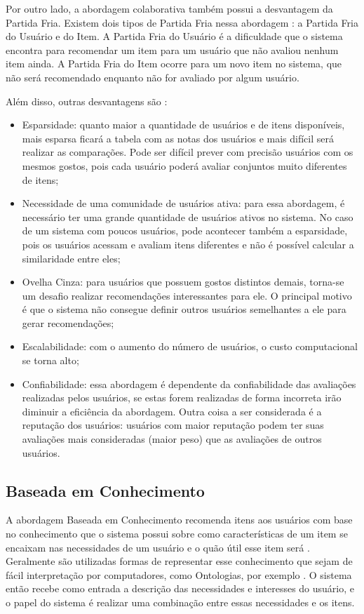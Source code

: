 Por outro lado, a abordagem colaborativa também possui a desvantagem da Partida Fria. Existem dois tipos de Partida Fria
nessa abordagem \cite{adomavicius2005toward}: a Partida Fria do Usuário e do Item. A Partida Fria do Usuário é a dificuldade
que o sistema encontra para recomendar um item para um usuário que não avaliou nenhum item ainda. A Partida Fria do Item
ocorre para um novo item no sistema, que não será recomendado enquanto não for avaliado por algum usuário.

Além disso, outras desvantagens são \cite{adomavicius2005toward}:

\begin{itemize}
\item Esparsidade: quanto maior a quantidade de usuários e de itens disponíveis, mais esparsa ficará a tabela com as
notas dos usuários e mais difícil será realizar as comparações. Pode ser difícil prever com precisão usuários com os
mesmos gostos, pois cada usuário poderá avaliar conjuntos muito diferentes de itens;
\item Necessidade de uma comunidade de usuários ativa: para essa abordagem, é necessário ter uma grande quantidade de
usuários ativos no sistema. No caso de um sistema com poucos usuários, pode acontecer também a esparsidade,
pois os usuários acessam e avaliam itens diferentes e não é possível calcular a similaridade entre eles;
\item Ovelha Cinza: para usuários que possuem gostos distintos demais, torna-se um desafio realizar recomendações
interessantes para ele. O principal motivo é que o sistema não consegue definir outros usuários semelhantes a ele para
gerar recomendações;
\item Escalabilidade: com o aumento do número de usuários, o custo computacional se torna alto;
\item Confiabilidade: essa abordagem é dependente da confiabilidade das avaliações realizadas pelos usuários, se estas forem
realizadas de forma incorreta irão diminuir a eficiência da abordagem. Outra coisa a ser considerada é a reputação dos
usuários: usuários com maior reputação podem ter suas avaliações mais consideradas (maior peso) que as avaliações de
outros usuários.
\end{itemize}

\subsection{Baseada em Conhecimento}

A abordagem Baseada em Conhecimento recomenda itens aos usuários com base no conhecimento que o sistema possui sobre
como características de um item se encaixam nas necessidades de um usuário e o quão útil esse item será
\cite{ricci2011introduction}. Geralmente são utilizadas formas de representar esse conhecimento que sejam de fácil interpretação
por computadores, como Ontologias, por exemplo \cite{burke2002hybrid}. O sistema então recebe como entrada a descrição das
necessidades e interesses do usuário, e o papel do sistema é realizar uma combinação entre essas necessidades e os itens.

